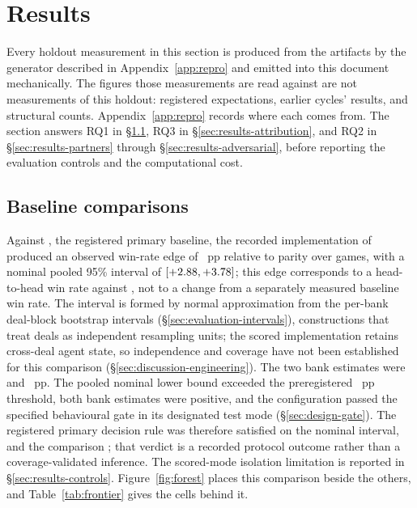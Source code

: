 \section{Results}
\label{sec:results}

Every holdout measurement in this section is produced from the artifacts by the generator
described in Appendix~\ref{app:repro} and emitted into this document mechanically. The figures those
measurements are read against are not measurements of this holdout: registered expectations,
earlier cycles' results, and structural counts. Appendix~\ref{app:repro} records where each comes
from. The section answers RQ1 in
\S\ref{sec:results-primary}, RQ3 in \S\ref{sec:results-attribution}, and RQ2 in
\S\ref{sec:results-partners} through \S\ref{sec:results-adversarial}, before reporting the
evaluation controls and the computational cost.

\subsection{Baseline comparisons}
\label{sec:results-primary}

Against \fcheap{}, the registered primary baseline, the recorded implementation of \sestina{}
produced an observed win-rate edge of \vsevenBtwoFcheap{}~pp relative to parity over
\vsevenBtwoFcheapN{} games, with a nominal pooled 95\% interval of
$[+2.88, +3.78]$; this edge corresponds to a \vsevenBtwoFcheapWinRate{}
head-to-head win rate against \fcheap{}, not to a change from a separately measured baseline win
rate. The interval is formed by normal approximation from the per-bank deal-block bootstrap
intervals (\S\ref{sec:evaluation-intervals}), constructions that treat deals as independent
resampling units; the scored implementation retains cross-deal agent state, so independence and
coverage have not been established for this comparison (\S\ref{sec:discussion-engineering}). The
two bank estimates were \vsevenBtwoFcheapBankOne{} and
\vsevenBtwoFcheapBankTwo{}~pp. The pooled nominal lower bound exceeded the preregistered
\vsevenPrimaryFloor{}~pp threshold, both bank estimates were positive, and the configuration passed
the specified behavioural gate in its designated test mode (\S\ref{sec:design-gate}). The
registered primary decision rule was therefore satisfied on the nominal interval, and the
comparison \vsevenPrimaryVerdict{}; that verdict is a recorded protocol outcome rather than a
coverage-validated inference. The scored-mode isolation limitation is reported in
\S\ref{sec:results-controls}. Figure~\ref{fig:forest} places this comparison beside the others, and
Table~\ref{tab:frontier} gives the cells behind it.

